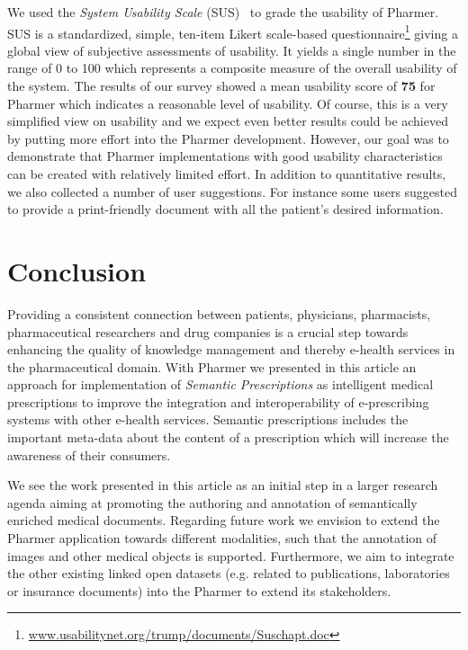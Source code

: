 \documentclass[10pt, conference, compsocconf]{IEEEtran}
\begin{document}
We used the \emph{System Usability Scale} (SUS)~\cite{SUS2009} to grade the usability of Pharmer.
SUS is a standardized, simple, ten-item Likert scale-based questionnaire\footnote{\url{www.usabilitynet.org/trump/documents/Suschapt.doc}} giving a global view of subjective assessments of usability.
It yields a single number in the range of 0 to 100 which represents a composite measure of the overall usability of the system.
The results of our survey showed a mean usability score of \textbf{75} for Pharmer which indicates a reasonable level of usability.
Of course, this is a very simplified view on usability and we expect even better results could be achieved by putting more effort into the Pharmer development.
However, our goal was to demonstrate that Pharmer implementations with good usability characteristics can be created with relatively limited effort.
In addition to quantitative results, we also collected a number of user suggestions.
For instance some users suggested to provide a print-friendly document with all the patient's desired information.


\section{Conclusion}
\label{sec:conclusion}
Providing a consistent connection between patients, physicians, pharmacists, pharmaceutical researchers and drug companies is a crucial step towards enhancing the quality of knowledge management and thereby e-health services in the pharmaceutical domain.
With Pharmer we presented in this article an approach for implementation of \emph{Semantic Prescriptions} as intelligent medical prescriptions to improve the integration and interoperability of e-prescribing systems with other e-health services.
Semantic prescriptions includes the important meta-data about the content of a prescription which will increase the awareness of their consumers.

We see the work presented in this article as an initial step in a larger research agenda aiming at promoting the authoring and annotation of semantically enriched medical documents.
Regarding future work we envision to extend the Pharmer application towards different modalities, such that the annotation of images and other medical objects is supported.
Furthermore, we aim to integrate the other existing linked open datasets (e.g. related to publications, laboratories or insurance documents) into the Pharmer to extend its stakeholders.









\end{document}
